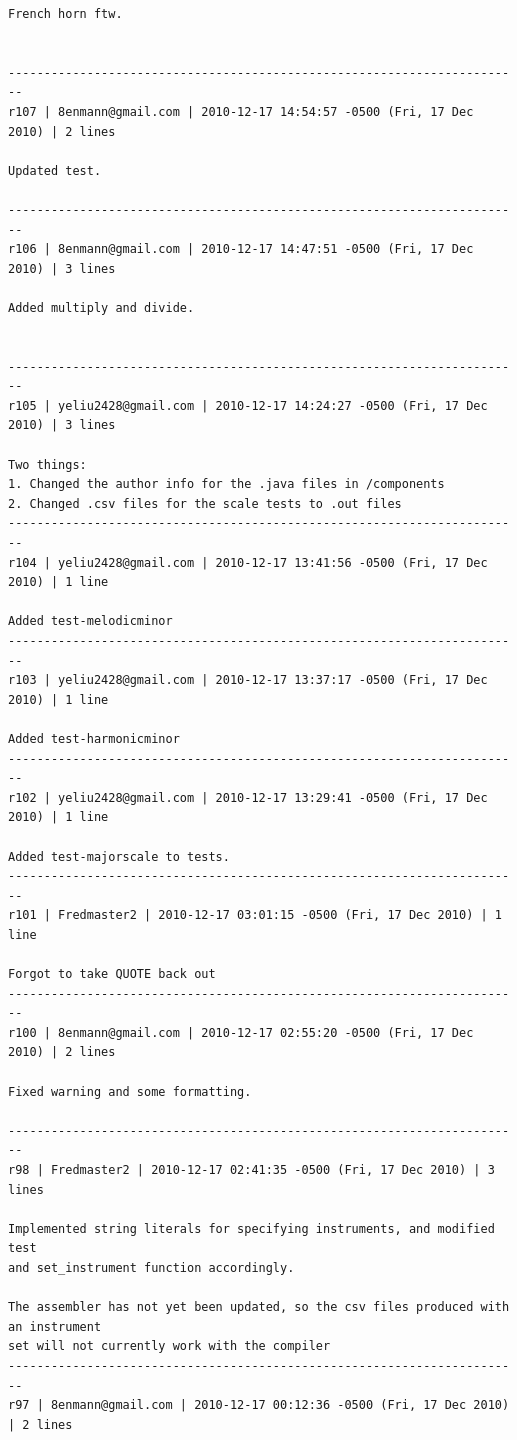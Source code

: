 \documentclass[12pt,A4]{book}
\begin{document}
\begin{verbatim}
French horn ftw.


------------------------------------------------------------------------
r107 | 8enmann@gmail.com | 2010-12-17 14:54:57 -0500 (Fri, 17 Dec 2010) | 2 lines

Updated test.

------------------------------------------------------------------------
r106 | 8enmann@gmail.com | 2010-12-17 14:47:51 -0500 (Fri, 17 Dec 2010) | 3 lines

Added multiply and divide.


------------------------------------------------------------------------
r105 | yeliu2428@gmail.com | 2010-12-17 14:24:27 -0500 (Fri, 17 Dec 2010) | 3 lines

Two things:
1. Changed the author info for the .java files in /components
2. Changed .csv files for the scale tests to .out files
------------------------------------------------------------------------
r104 | yeliu2428@gmail.com | 2010-12-17 13:41:56 -0500 (Fri, 17 Dec 2010) | 1 line

Added test-melodicminor
------------------------------------------------------------------------
r103 | yeliu2428@gmail.com | 2010-12-17 13:37:17 -0500 (Fri, 17 Dec 2010) | 1 line

Added test-harmonicminor
------------------------------------------------------------------------
r102 | yeliu2428@gmail.com | 2010-12-17 13:29:41 -0500 (Fri, 17 Dec 2010) | 1 line

Added test-majorscale to tests.
------------------------------------------------------------------------
r101 | Fredmaster2 | 2010-12-17 03:01:15 -0500 (Fri, 17 Dec 2010) | 1 line

Forgot to take QUOTE back out
------------------------------------------------------------------------
r100 | 8enmann@gmail.com | 2010-12-17 02:55:20 -0500 (Fri, 17 Dec 2010) | 2 lines

Fixed warning and some formatting.

------------------------------------------------------------------------
r98 | Fredmaster2 | 2010-12-17 02:41:35 -0500 (Fri, 17 Dec 2010) | 3 lines

Implemented string literals for specifying instruments, and modified test 
and set_instrument function accordingly.

The assembler has not yet been updated, so the csv files produced with an instrument 
set will not currently work with the compiler
------------------------------------------------------------------------
r97 | 8enmann@gmail.com | 2010-12-17 00:12:36 -0500 (Fri, 17 Dec 2010) | 2 lines


\end{verbatim}
\end{document}
